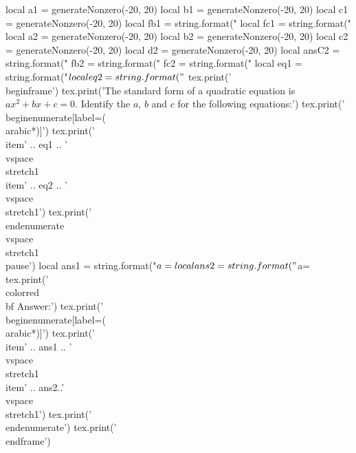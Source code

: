 \documentclass[10pt]{beamer}
\begin{document}
\begin{luacode*}
local a1 = generateNonzero(-20, 20)
local b1 = generateNonzero(-20, 20)
local c1 = generateNonzero(-20, 20)
local fb1 = string.format("%
local fc1 = string.format("%
local a2 = generateNonzero(-20, 20)
local b2 = generateNonzero(-20, 20)
local c2 = generateNonzero(-20, 20)
local d2 = generateNonzero(-20, 20)
local ansC2 = string.format("%
fb2 = string.format("%
fc2 = string.format("%
local eq1 = string.format("$%
local eq2 = string.format("$%
tex.print('\\begin{frame}')
tex.print('The standard form of a quadratic equation is $ax^2 + bx + c = 0$. Identify the $a$, $b$ and $c$ for the following equations:')
tex.print('\\begin{enumerate}[label=(\\arabic*)]')
tex.print('\\item' .. eq1 .. '\\vspace{\\stretch{1}}\\item' .. eq2 .. '\\vspace{\\stretch{1}}')
tex.print('\\end{enumerate}\\vspace{\\stretch{1}}\\pause')
local ans1 = string.format("$a=%
local ans2 = string.format("$a=%
tex.print('\\color{red} {\\bf Answer:}')
tex.print('\\begin{enumerate}[label=(\\arabic*)]')
tex.print('\\item' .. ans1  .. '\\vspace{\\stretch{1}}\\item' .. ans2..'\\vspace{\\stretch{1}}')
tex.print('\\end{enumerate}')
tex.print('\\end{frame}')
\end{luacode*}
\end{document}
